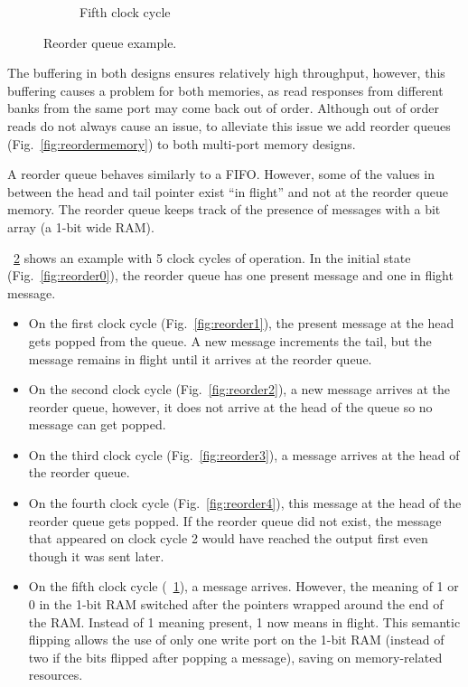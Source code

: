 \begin{figure}
\begin{subfigure}{.32\linewidth}
\begin{tikzpicture}
            \end{tikzpicture}
            \caption{Fifth clock cycle}
            \label{fig:reorder5}
        \end{subfigure}
        \caption{Reorder queue example.}
        \label{fig:reorder}
    \end{figure}

    The buffering in both designs ensures relatively high throughput, however, this buffering causes a problem for both memories, as read responses from different banks from the same port may come back out of order. Although out of order reads do not always cause an issue, to alleviate this issue we add reorder queues (Fig.~\ref{fig:reordermemory}) to both multi-port memory designs.

    A reorder queue behaves similarly to a FIFO. However, some of the values in between the head and tail pointer exist ``in flight'' and not at the reorder queue memory. The reorder queue keeps track of the presence of messages with a bit array (a 1-bit wide RAM).

    \figurename~\ref{fig:reorder} shows an example with 5 clock cycles of operation. In the initial state (Fig.~\ref{fig:reorder0}), the reorder queue has one present message and one in flight message.

    \begin{itemize}
        \item On the first clock cycle (Fig.~\ref{fig:reorder1}), the present message at the head gets popped from the queue. A new message increments the tail, but the message remains in flight until it arrives at the reorder queue.

        \item On the second clock cycle (Fig.~\ref{fig:reorder2}), a new message arrives at the reorder queue, however, it does not arrive at the head of the queue so no message can get popped.

        \item On the third clock cycle (Fig.~\ref{fig:reorder3}), a message arrives at the head of the reorder queue.

        \item On the fourth clock cycle (Fig.~\ref{fig:reorder4}), this message at the head of the reorder queue gets popped. If the reorder queue did not exist, the message that appeared on clock cycle 2 would have reached the output first even though it was sent later.

        \item On the fifth clock cycle (\figurename~\ref{fig:reorder5}), a message arrives. However, the meaning of 1 or 0 in the 1-bit RAM switched after the pointers wrapped around the end of the RAM. Instead of 1 meaning present, 1 now means in flight. This semantic flipping allows the use of only one write port on the 1-bit RAM (instead of two if the bits flipped after popping a message), saving on memory-related resources. 
    \end{itemize}

